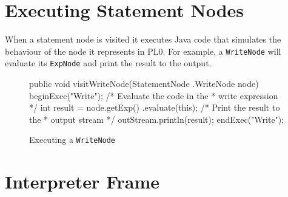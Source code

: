 \documentclass[a4paper,twoside,twocolumn]{article}
\begin{document}
\section{Executing Statement Nodes}\label{section:statements}
When a statement node is visited it executes Java code that simulates the
behaviour of the node it represents in PL0. For example, a \texttt{WriteNode}
will evaluate its \texttt{ExpNode} and print the result to the output.

\begin{figure}[H]
\begin{java}
public void visitWriteNode(StatementNode
        .WriteNode node) {
    beginExec("Write");
    /* Evaluate the code in the
     * write expression */
    int result = node.getExp()
            .evaluate(this);
    /* Print the result to the 
     * output stream */
    outStream.println(result);
    endExec("Write");
}
\end{java}
\caption{Executing a \texttt{WriteNode}}\label{figure:writenode}
\end{figure}

\section{Interpreter Frame}\label{section:frame}

\end{document}
